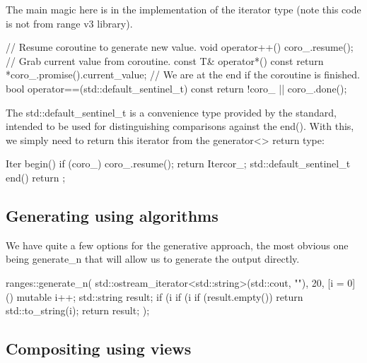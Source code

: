 The main magic here is in the implementation of the iterator type (note this code is not from range v3 library).

\begin{box-note}
\begin{cppcode}
// Resume coroutine to generate new value.
void operator++() { 
    coro_.resume(); 
}
// Grab current value from coroutine.
const T& operator*() const {
    return *coro_.promise().current_value;
}
// We are at the end if the coroutine is finished.
bool operator==(std::default_sentinel_t) const { 
    return !coro_ || coro_.done(); 
}
\end{cppcode}
\end{box-note}

The std::default\_sentinel\_t is a convenience type provided by the standard, intended to be used for distinguishing comparisons against the end(). With this, we simply need to return this iterator from the generator<> return type:

\begin{box-note}
\begin{cppcode}
Iter begin() {
    if (coro_) {
        coro_.resume();
    } 
    return Iter{cor_};
}
std::default_sentinel_t end() { 
    return {}; 
}
\end{cppcode}
\end{box-note}

\subsection{Generating using algorithms}

We have quite a few options for the generative approach, the most obvious one being generate\_n that will allow us to generate the output directly.

\begin{box-note}
\begin{cppcode}
ranges::generate_n(
    std::ostream_iterator<std::string>(std::cout, "\n"), 
    20,
    [i = 0]() mutable {
        i++;
        std::string result;
        if (i %
        if (i %
        if (result.empty()) return std::to_string(i);
        return result;
});
\end{cppcode}
\end{box-note}

\subsection{Compositing using views}

